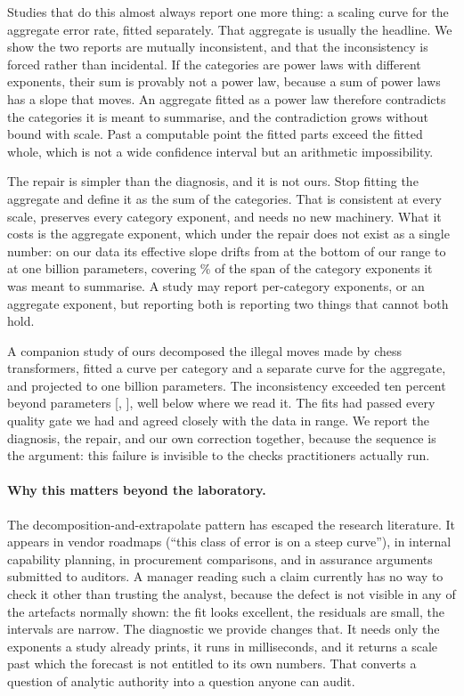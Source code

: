 \documentclass[11pt]{article}
\newif\ifanon
\begin{document}
Studies that do this almost always report one more thing: a scaling curve for the
aggregate error rate, fitted separately. That aggregate is usually the headline. We
show the two reports are mutually inconsistent, and that the inconsistency is forced
rather than incidental. If the categories are power laws with different exponents,
their sum is provably not a power law, because a sum of power laws has a slope that
moves. An aggregate fitted as a power law therefore contradicts the categories it is
meant to summarise, and the contradiction grows without bound with scale. Past a
computable point the fitted parts exceed the fitted whole, which is not a wide
confidence interval but an arithmetic impossibility.

The repair is simpler than the diagnosis, and it is not ours. Stop fitting the
aggregate and define it as the sum of the categories. That is consistent at every
scale, preserves every category exponent, and needs no new machinery. What it costs
is the aggregate exponent, which under the repair does not exist as a single number:
on our data its effective slope drifts from  at the bottom of
our range to  at one billion parameters, covering
\% of the span of the category exponents it was meant to
summarise. A study may report per-category exponents, or an aggregate exponent, but
reporting both is reporting two things that cannot both hold.

A companion study of ours
\ifanon (Anonymous, 2026)\else\citep{rathore2026scale}\fi{} decomposed the illegal
moves made by chess transformers, fitted a curve per category and a separate curve
for the aggregate, and projected to one billion parameters. The inconsistency
exceeded ten percent beyond  parameters
[, ], well below where we read it. The
fits had passed every quality gate we had and agreed closely with the data in range.
We report the diagnosis, the repair, and our own correction together, because the
sequence is the argument: this failure is invisible to the checks practitioners
actually run.

\paragraph{Why this matters beyond the laboratory.}
The decomposition-and-extrapolate pattern has escaped the research literature. It
appears in vendor roadmaps (``this class of error is on a steep curve''), in
internal capability planning, in procurement comparisons, and in assurance
arguments submitted to auditors. A manager reading such a claim currently has no
way to check it other than trusting the analyst, because the defect is not visible
in any of the artefacts normally shown: the fit looks excellent, the residuals are
small, the intervals are narrow. The diagnostic we provide changes that. It needs
only the exponents a study already prints, it runs in milliseconds, and it returns
a scale past which the forecast is not entitled to its own numbers. That converts a
question of analytic authority into a question anyone can audit.
\end{document}
